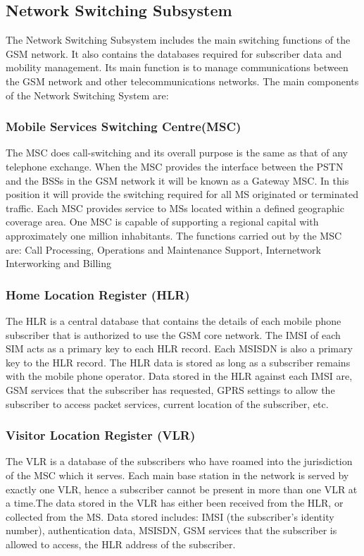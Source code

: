 \subsection{Network Switching Subsystem}
The Network Switching Subsystem includes 
the main switching functions of the GSM network. It also contains the databases
required for subscriber data and mobility management. Its main function is 
to manage communications between the GSM network and other telecommunications 
networks. The main components of the Network Switching System are: 

	
\subsubsection*{Mobile Services Switching Centre(MSC)}
The MSC does call-switching 
and its overall purpose is the same as that of any telephone exchange. When 
the MSC provides the interface between the PSTN and the BSSs in the GSM 
network it will be known as a Gateway MSC. In this position it will provide 
the switching required for all MS originated or terminated traffic. Each 
MSC provides service to MSs located within a defined geographic coverage 
area. One MSC is capable of supporting a regional capital with approximately
 one million inhabitants. 
The functions carried out by the MSC are: Call Processing, Operations and 
Maintenance Support, Internetwork Interworking and Billing

\subsubsection*{Home Location Register (HLR)}
The HLR is a central database that contains the details of each mobile phone 
subscriber that is authorized to use the GSM core network. The IMSI of 
each SIM acts as a primary key to each HLR record. Each MSISDN is
also a primary key to the HLR record. The HLR data is stored 
as long as a subscriber remains with the mobile phone operator.
Data stored in the HLR against each IMSI are, GSM services that the 
subscriber has requested, GPRS settings to allow the subscriber to 
access packet services, current location of the subscriber, etc.

\subsubsection*{Visitor Location Register (VLR)}
The VLR is a database of the subscribers who have roamed into the jurisdiction
of the MSC which it serves. Each main base station in the network is served by 
exactly one VLR, hence a subscriber cannot be present in more than
one VLR at a time.The data stored in the VLR has either been received
from the HLR, or collected from the MS. Data stored includes: IMSI
(the subscriber's identity number), authentication data, MSISDN, 
GSM services that the subscriber is allowed to access, the HLR address 
of the subscriber.



